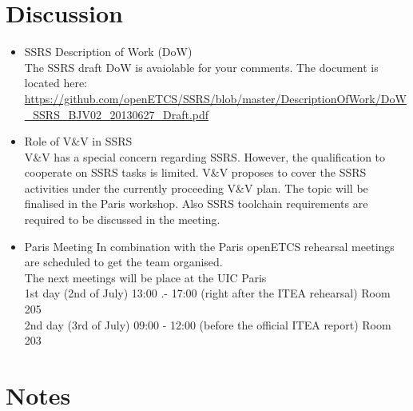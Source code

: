 \documentclass[a4paper, 11pt]{article}
\begin{document}
\section{Discussion}
\begin{itemize}
\item SSRS Description of Work (DoW)\\
The SSRS draft DoW is avaiolable for your comments. The document is located here:\\
\url{https://github.com/openETCS/SSRS/blob/master/DescriptionOfWork/DoW_SSRS_BJV02_20130627_Draft.pdf}\\

\item Role of V\&V in SSRS\\
V\&V has a special concern regarding SSRS. However, the qualification to cooperate on SSRS tasks is limited. V\&V proposes to cover the SSRS activities under the currently proceeding V\&V plan. The topic will be finalised in the Paris workshop. Also SSRS toolchain requirements are required  to be discussed in the meeting.

\item Paris Meeting
In combination with the Paris openETCS rehearsal meetings are scheduled to get the team organised.\\
The next meetings will be place at the UIC Paris\\
1st day (2nd of July) 13:00 .- 17:00 (right after the ITEA rehearsal) Room 205\\
2nd day (3rd of July) 09:00 - 12:00 (before the official ITEA report) Room 203\\

\end{itemize}


\section{Notes}
\end{document}
